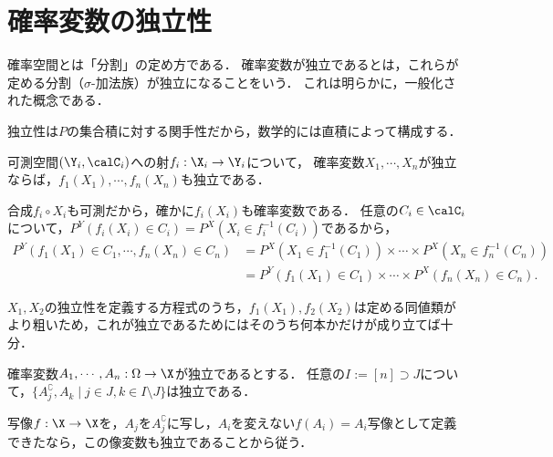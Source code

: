 \documentclass[uplatex,dvipdfmx]{jsreport}
\begin{document}
\section{確率変数の独立性}

\begin{tcolorbox}[colframe=ForestGreen, colback=ForestGreen!10!white,breakable,colbacktitle=ForestGreen!40!white,coltitle=black,fonttitle=\bfseries\sffamily,
title=]
    確率空間とは「分割」の定め方である．
    確率変数が独立であるとは，これらが定める分割（$\sigma$-加法族）が独立になることをいう．
    これは明らかに，一般化された概念である．

    独立性は$P$の集合積に対する関手性だから，数学的には直積によって構成する．
\end{tcolorbox}

\begin{proposition}[可測関数は独立性を保つ]\label{prop-measurable-functions-perserve-independentness}
    可測空間$(\Y_i,\calC_i)$への射$f_i:\X_i\to\Y_i$について，
    確率変数$X_1,\cdots,X_n$が独立ならば，$f_1(X_1),\cdots,f_n(X_n)$も独立である．
\end{proposition}
\begin{Proof}
    合成$f_i\circ X_i$も可測だから，確かに$f_i(X_i)$も確率変数である．
    任意の$C_i\in\calC_i$について，$P^Y(f_i(X_i)\in C_i)=P^X(X_i\in f^{-1}_i(C_i))$であるから，
    \begin{align*}
        P^Y(f_1(X_1)\in C_1,\cdots,f_n(X_n)\in C_n)&=P^X(X_1\in f^{-1}_1(C_1))\times\cdots\times P^X(X_n\in f^{-1}_n(C_n))\\
        &=P^Y(f_1(X_1)\in C_1)\times\cdots\times P^X(f_n(X_n)\in C_n).
    \end{align*}
\end{Proof}
\begin{remarks}
    $X_1,X_2$の独立性を定義する方程式のうち，$f_1(X_1),f_2(X_2)$は定める同値類がより粗いため，これが独立であるためにはそのうち何本かだけが成り立てば十分．
\end{remarks}

\begin{proposition}
    確率変数$A_1,\cdots,A_n:\Omega\to\X$が独立であるとする．
    任意の$I:=[n]\supset J$について，$\{A_j^\complement,A_k\mid j\in J,k\in I\setminus J\}$は独立である．
\end{proposition}
\begin{Proof}
    写像$f:\X\to\X$を，$A_j$を$A_j^\complement$に写し，$A_i$を変えない$f(A_i)=A_i$写像として定義できたなら，この像変数も独立であることから従う．
\end{Proof}
\end{document}
